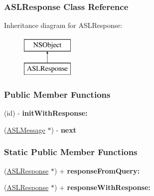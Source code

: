 \hypertarget{interface_a_s_l_response}{
\subsubsection{ASLResponse Class Reference}
\label{interface_a_s_l_response}
}
Inheritance diagram for ASLResponse:\begin{figure}[h]
\begin{center}
\leavevmode
\includegraphics[height=2.000000cm]{interface_a_s_l_response}
\end{center}
\end{figure}
\subsubsection*{Public Member Functions}
\begin{DoxyCompactItemize}
\item 
\hypertarget{interface_a_s_l_response_acb08ad55c7025c15d01facfa3dd6ebfa}{
(id) -\/ {\bfseries initWithResponse:}}
\label{interface_a_s_l_response_acb08ad55c7025c15d01facfa3dd6ebfa}

\item 
\hypertarget{interface_a_s_l_response_ae51a579bf44e57120177aefda4dab16a}{
(\hyperlink{interface_a_s_l_message}{ASLMessage} $\ast$) -\/ {\bfseries next}}
\label{interface_a_s_l_response_ae51a579bf44e57120177aefda4dab16a}

\end{DoxyCompactItemize}
\subsubsection*{Static Public Member Functions}
\begin{DoxyCompactItemize}
\item 
\hypertarget{interface_a_s_l_response_aa842290389e2f2c457d51fdd042f7e1b}{
(\hyperlink{interface_a_s_l_response}{ASLResponse} $\ast$) + {\bfseries responseFromQuery:}}
\label{interface_a_s_l_response_aa842290389e2f2c457d51fdd042f7e1b}

\item 
\hypertarget{interface_a_s_l_response_afbf1e03aa75f9439232046a1eeb392f5}{
(\hyperlink{interface_a_s_l_response}{ASLResponse} $\ast$) + {\bfseries responseWithResponse:}}
\label{interface_a_s_l_response_afbf1e03aa75f9439232046a1eeb392f5}

\end{DoxyCompactItemize}
